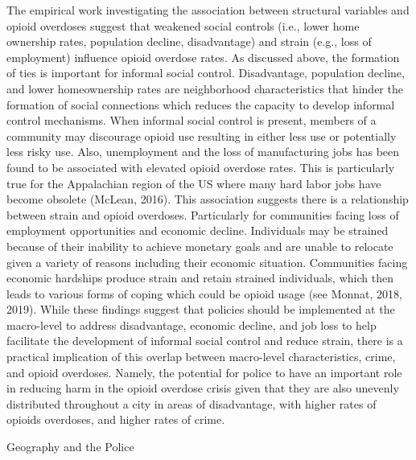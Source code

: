 The empirical work investigating the association between structural variables and opioid overdoses suggest that weakened social controls (i.e., lower home ownership rates, population decline, disadvantage) and strain (e.g., loss of employment) influence opioid overdose rates. As discussed above, the formation of ties is important for informal social control. Disadvantage, population decline, and lower homeownership rates are neighborhood characteristics that hinder the formation of social connections which reduces the capacity to develop informal control mechanisms. When informal social control is present, members of a community may discourage opioid use resulting in either less use or potentially less risky use. Also, unemployment and the loss of manufacturing jobs has been found to be associated with elevated opioid overdose rates. This is particularly true for the Appalachian region of the US where many hard labor jobs have become obsolete (McLean, 2016). This association suggests there is a relationship between strain and opioid overdoses. Particularly for communities facing loss of employment opportunities and economic decline. Individuals may be strained because of their inability to achieve monetary goals and are unable to relocate given a variety of reasons including their economic situation. Communities facing economic hardships produce strain and retain strained individuals, which then leads to various forms of coping which could be opioid usage (see Monnat, 2018, 2019). While these findings suggest that policies should be implemented at the macro-level to address disadvantage, economic decline, and job loss to help facilitate the development of informal social control and reduce strain, there is a practical implication of this overlap between macro-level characteristics, crime, and opioid overdoses. Namely, the potential for police to have an important role in reducing harm in the opioid overdose crisis given that they are also unevenly distributed throughout a city in areas of disadvantage, with higher rates of opioids overdoses, and higher rates of crime.

Geography and the Police

